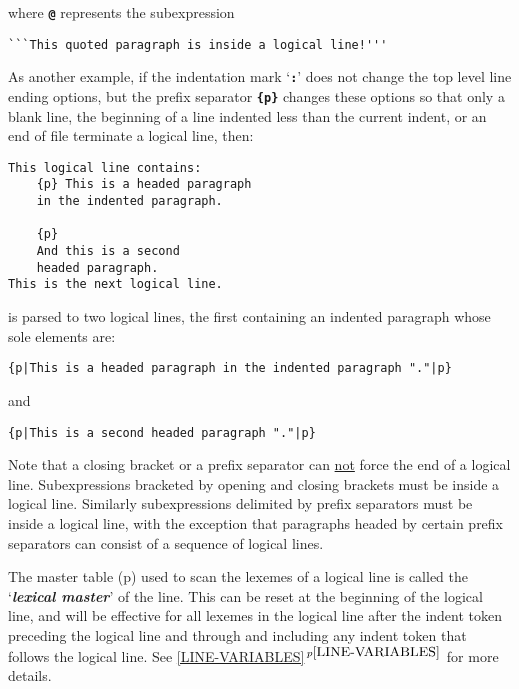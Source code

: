 \documentclass[12pt]{article}
\newcommand{\TT}[1]{{\tt \bfseries #1}}
\newcommand{\key}[1]{{\bf \em #1}\index{#1}}
\newcommand{\itemref}[1]{\ref{#1}$\,^{p\pageref{#1}}$}
\newcommand{\pagref}[1]{p\pageref{#1}}
\newenvironment{indpar}[1][0.3in]%
	{\begin{list}{}%
		     {\setlength{\itemsep}{0in}%
		      \setlength{\topsep}{0in}%
		      \setlength{\parsep}{1ex}%
		      \setlength{\labelwidth}{#1}%
		      \setlength{\leftmargin}{#1}%
		      \addtolength{\leftmargin}{\labelsep}}%
	 \item}%
	{\end{list}}
\begin{document}
where \TT{@} represents the subexpression

\begin{indpar}\begin{verbatim}
```This quoted paragraph is inside a logical line!'''
\end{verbatim}\end{indpar}

As another example, if the indentation mark `\TT{:}' does not
change the top level line ending options, but
the prefix separator \TT{\{p\}} changes these
options so that only a blank line, the beginning of a
line indented less than the current indent, or an end of file
terminate a logical line,
then:
\begin{indpar}\begin{verbatim}
This logical line contains:
    {p} This is a headed paragraph
    in the indented paragraph.

    {p}
    And this is a second
    headed paragraph.
This is the next logical line.
\end{verbatim}\end{indpar}

is parsed to two logical lines, the first containing an indented paragraph
whose sole elements are:
\begin{indpar}\small\begin{verbatim}
{p|This is a headed paragraph in the indented paragraph "."|p}
\end{verbatim}\end{indpar}

and

\begin{indpar}\begin{verbatim}
{p|This is a second headed paragraph "."|p}
\end{verbatim}\end{indpar}

Note that a closing bracket or a prefix separator can \underline{not}
force the end of a logical line.  Subexpressions bracketed by opening
and closing brackets must be inside a logical line.  Similarly subexpressions
delimited by prefix separators must be inside a logical line, with the
exception that paragraphs headed by certain prefix separators can
consist of a sequence of logical lines.

The master table (\pagref{MASTER-TABLE})
used to scan the lexemes of a logical line
is called the `\key{lexical master}'\label{LEXICAL-MASTER} of the line.
This can be reset at the beginning of the logical line,
and will be effective for all lexemes in the logical line after the indent token
preceding the logical line and through and including any indent token
that follows the logical line.
See \itemref{LINE-VARIABLES} for more details.
\end{document}

